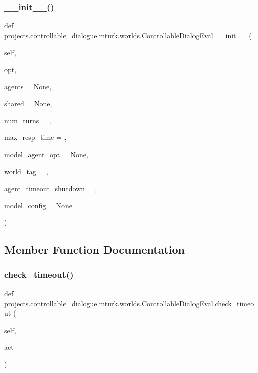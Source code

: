 \subsubsection{\texorpdfstring{\+\_\+\+\_\+init\+\_\+\+\_\+()}{\_\_init\_\_()}}
{\footnotesize\ttfamily def projects.\+controllable\+\_\+dialogue.\+mturk.\+worlds.\+Controllable\+Dialog\+Eval.\+\_\+\+\_\+init\+\_\+\+\_\+ (\begin{DoxyParamCaption}\item[{}]{self,  }\item[{}]{opt,  }\item[{}]{agents = {\ttfamily None},  }\item[{}]{shared = {\ttfamily None},  }\item[{}]{num\+\_\+turns = {},  }\item[{}]{max\+\_\+resp\+\_\+time = {},  }\item[{}]{model\+\_\+agent\+\_\+opt = {\ttfamily None},  }\item[{}]{world\+\_\+tag = {\ttfamily \textquotesingle{}\textquotesingle{}},  }\item[{}]{agent\+\_\+timeout\+\_\+shutdown = {},  }\item[{}]{model\+\_\+config = {\ttfamily None} }\end{DoxyParamCaption})}



\subsection{Member Function Documentation}
\mbox{\label{classprojects_1_1controllable__dialogue_1_1mturk_1_1worlds_1_1ControllableDialogEval_ad39af000fb38494d1c229e3a84195c7b}} 
\subsubsection{\texorpdfstring{check\+\_\+timeout()}{check\_timeout()}}
{\footnotesize\ttfamily def projects.\+controllable\+\_\+dialogue.\+mturk.\+worlds.\+Controllable\+Dialog\+Eval.\+check\+\_\+timeout (\begin{DoxyParamCaption}\item[{}]{self,  }\item[{}]{act }\end{DoxyParamCaption})}

